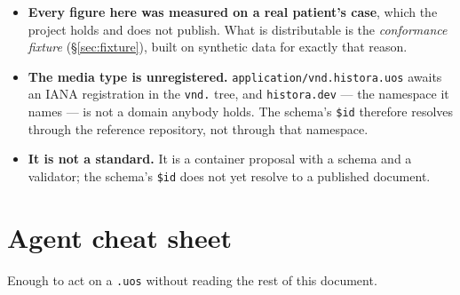 \documentclass[11pt,a4paper]{article}
\newcommand{\code}[1]{\texttt{\small #1}}
\begin{document}
\begin{itemize}
  \textbf{The reader it would serve barely exists}: reaching
  \code{derived/scene\_partitioned.glb} means knowing that a \code{.uos} is a ZIP, that
  \code{derived/} exists, and that an alternative scene lives inside it --- and a reader
  that knows all three already knows enough to join \code{derived/seg\_teeth.bin} by vertex
  index, which is 0.22\,MB against the 17.8\,MB the duplicate would cost. \textbf{And a
  duplicate with no arbiter is worse than the loss}: two copies of the same geometry, each
  individually valid, with nothing in the container declaring which one governs when they
  drift. A writer that has a concrete reader asking for it should emit it; one that does
  not, should not.
  \item \textbf{Every figure here was measured on a real patient's case}, which the project
  holds and does not publish. What is distributable is the \emph{conformance fixture}
  (\S\ref{sec:fixture}), built on synthetic data for exactly that reason.
  \item \textbf{The media type is unregistered.} \code{application/vnd.histora.uos}
  awaits an IANA registration in the \code{vnd.} tree, and \code{histora.dev} --- the
  namespace it names --- is not a domain anybody holds. The schema's \code{\$id} therefore
  resolves through the reference repository, not through that namespace.


  \item \textbf{It is not a standard.} It is a container proposal with a schema and a
  validator; the schema's \code{\$id} does not yet resolve to a published document.
\end{itemize}

\appendix
\section{Agent cheat sheet}\label{app:cheat}

Enough to act on a \code{.uos} without reading the rest of this document.
\end{document}
